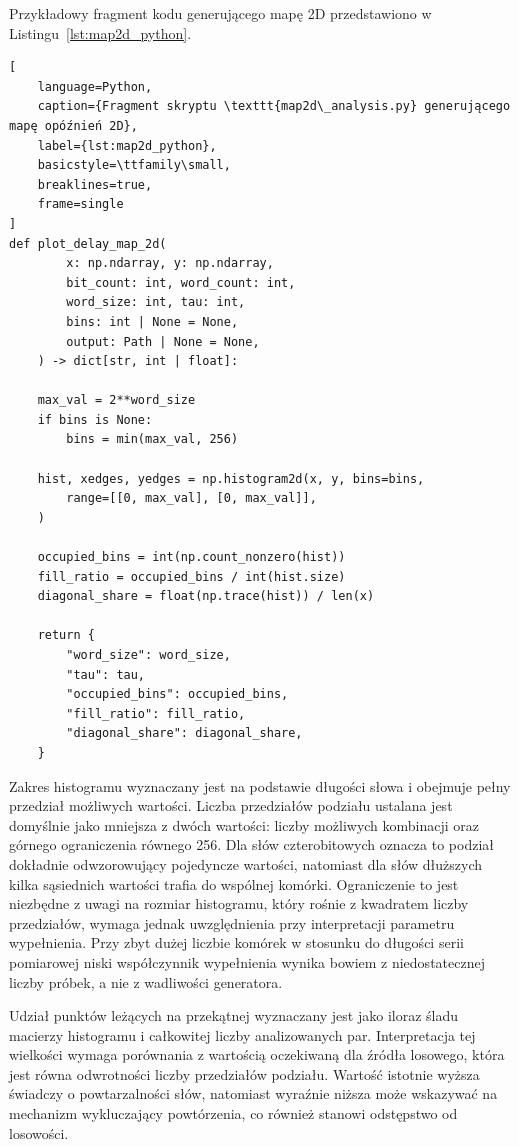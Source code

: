 Przykładowy fragment kodu generującego mapę 2D przedstawiono
w Listingu~\ref{lst:map2d_python}.

\begin{lstlisting}[
    language=Python,
    caption={Fragment skryptu \texttt{map2d\_analysis.py} generującego mapę opóźnień 2D},
    label={lst:map2d_python},
    basicstyle=\ttfamily\small,
    breaklines=true,
    frame=single
]
def plot_delay_map_2d(
        x: np.ndarray, y: np.ndarray,
        bit_count: int, word_count: int,
        word_size: int, tau: int,
        bins: int | None = None,
        output: Path | None = None,
    ) -> dict[str, int | float]: 

    max_val = 2**word_size
    if bins is None:
        bins = min(max_val, 256)

    hist, xedges, yedges = np.histogram2d(x, y, bins=bins,
        range=[[0, max_val], [0, max_val]],
    )

    occupied_bins = int(np.count_nonzero(hist))
    fill_ratio = occupied_bins / int(hist.size)
    diagonal_share = float(np.trace(hist)) / len(x)

    return {
        "word_size": word_size,
        "tau": tau,
        "occupied_bins": occupied_bins,
        "fill_ratio": fill_ratio,
        "diagonal_share": diagonal_share,
    }
\end{lstlisting}

Zakres histogramu wyznaczany jest na podstawie długości słowa i obejmuje pełny
przedział możliwych wartości. Liczba przedziałów podziału ustalana jest domyślnie
jako mniejsza z dwóch wartości: liczby możliwych kombinacji oraz górnego
ograniczenia równego 256. Dla słów czterobitowych oznacza to podział dokładnie
odwzorowujący pojedyncze wartości, natomiast dla słów dłuższych kilka sąsiednich
wartości trafia do wspólnej komórki. Ograniczenie to jest niezbędne z uwagi na
rozmiar histogramu, który rośnie z kwadratem liczby przedziałów, wymaga jednak
uwzględnienia przy interpretacji parametru wypełnienia. Przy zbyt dużej liczbie
komórek w stosunku do długości serii pomiarowej niski współczynnik wypełnienia
wynika bowiem z niedostatecznej liczby próbek, a nie z wadliwości generatora.

Udział punktów leżących na przekątnej wyznaczany jest jako iloraz śladu macierzy
histogramu i całkowitej liczby analizowanych par. Interpretacja tej wielkości
wymaga porównania z wartością oczekiwaną dla źródła losowego, która jest równa
odwrotności liczby przedziałów podziału. Wartość istotnie wyższa świadczy
o powtarzalności słów, natomiast wyraźnie niższa może wskazywać na mechanizm
wykluczający powtórzenia, co również stanowi odstępstwo od losowości.

